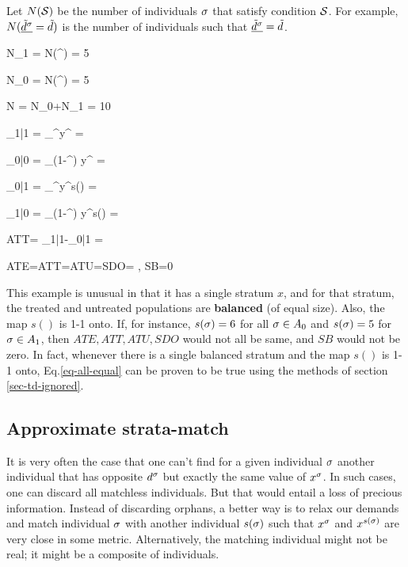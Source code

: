 Let $N({\cal S})$
be the number of individuals $\sigma$
that satisfy condition ${\cal S}$.
For example, 
$N(\underline{{\tilde{d}}^\sigma}={\tilde{d}})$
is the number of individuals
such that $\underline{{\tilde{d}}^\sigma}={\tilde{d}}$.

\beq
N_1
=
N(\td^)
=
5
\eeq

\beq
N_0
=
N(\td^)
=
5
\eeq

\beq
N
= N_0+N_1
=
10
\eeq



\beq
\caly_{1|1}
=
\sum_\s \td^\s y^\s
=
\eeq

\beq
\caly_{0|0}
=
\sum_\s (1-\td^\s) y^\s
=
\eeq

\beq
\caly_{0|1}
=
\sum_\s \td^\s y^{s(\s)}
=
\eeq

\beq
\caly_{1|0}
=
\sum_\s (1-\td^\s) y^{s(\s)}
=
\eeq

\beq
ATT=
\caly_{1|1}-\caly_{0|1}
=
\eeq

\beq
ATE=ATT=ATU=SDO=
\;,\;\; SB=0
\label{eq-all-equal}
\eeq

This example is unusual
in that it has a single
stratum $x$, and for
that stratum, 
the treated and 
untreated populations
are {\bf balanced} (of equal size).
Also, the map $s()$
is 1-1 onto.
If, for instance,
$s(\sigma)=6$ for all $\sigma\in A_0$
and $s(\sigma)=5$ for $\sigma\in A_1$,
then $ATE, ATT, ATU, SDO$
would not all be same, and 
$SB$ would not be zero.  
In fact, whenever there is a single
balanced stratum and the map $s()$
is 1-1 onto, Eq.\ref{eq-all-equal}
can be proven to be true using
the methods of
section \ref{sec-td-ignored}.



\subsection{Approximate strata-match}

It is very often
the case that
one can't
find for a given
individual $\sigma$
another individual that has
opposite $d^\sigma$ but
exactly the same value of $x^\sigma$.
In such cases, one can discard all
matchless individuals.
But that would entail a loss 
of precious information.
Instead of discarding orphans, 
a better way is to
relax our demands and
match individual $\sigma$
with another individual $s(\sigma)$
such that $x^\sigma$
and $x^{s(\sigma)}$ are very
close in some metric.
Alternatively, the matching
individual might 
not be real; it might
be a composite
of individuals.

